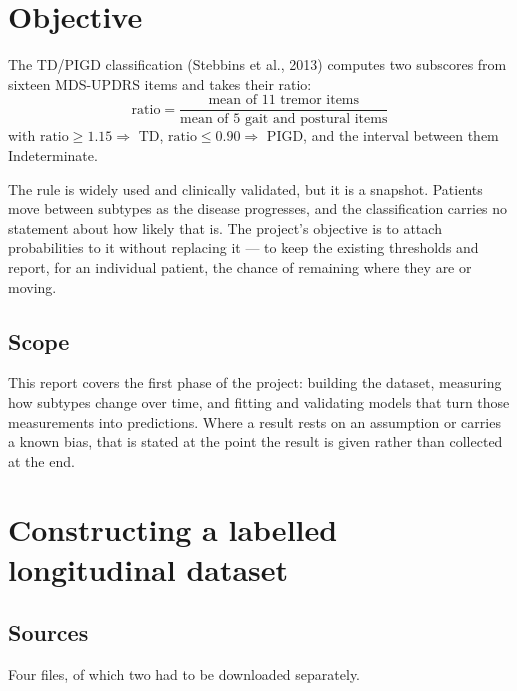 \documentclass[11pt,a4paper]{article}
\begin{document}
\clearpage
\tableofcontents
\clearpage

\section{Objective}

The TD/PIGD classification (Stebbins et al., 2013) computes two subscores from
sixteen MDS-UPDRS items and takes their ratio:
\[
  \text{ratio} = \frac{\text{mean of 11 tremor items}}{\text{mean of 5 gait and postural items}}
\]
with $\text{ratio} \geq 1.15 \Rightarrow$ TD, $\text{ratio} \leq 0.90 \Rightarrow$
PIGD, and the interval between them Indeterminate.

The rule is widely used and clinically validated, but it is a snapshot. Patients
move between subtypes as the disease progresses, and the classification carries
no statement about how likely that is. The project's objective is to attach
probabilities to it without replacing it --- to keep the existing thresholds and
report, for an individual patient, the chance of remaining where they are or
moving.

\subsection{Scope}

This report covers the first phase of the project: building the dataset,
measuring how subtypes change over time, and fitting and validating models that
turn those measurements into predictions. Where a result rests on an assumption
or carries a known bias, that is stated at the point the result is given rather
than collected at the end.

\section{Constructing a labelled longitudinal dataset}

\subsection{Sources}

Four files, of which two had to be downloaded separately.
\end{document}
